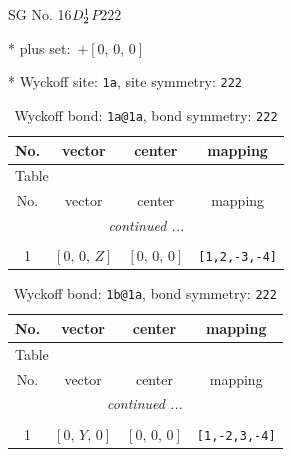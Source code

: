\documentclass[fleqn,8pt]{jsarticle}
\begin{document}
\setcounter{MaxMatrixCols}{32}

\renewcommand{\tablename}{Table~}
\renewcommand{\figurename}{Figure~}
\begin{center}
\LARGE
SG No. 16\quad$D_{\rm 2}^{1}$\quad$P222$\quad[ orthorhombic ]
\end{center}

* plus set:\,\,\,$+\left[ 0,\, 0,\, 0 \right]$


* Wyckoff site: {\tt 1a}, site symmetry: {\tt 222}
\renewcommand{\arraystretch}{1.2}
\begin{longtable}{cccc}
\caption{Wyckoff bond: {\tt 1a@1a}, bond symmetry: {\tt 222}}
 \\
 \hline \hline
No. & vector & center & mapping \\ \hline \endfirsthead

\multicolumn{3}{l}{\tablename\ \thetable{}} \\
 \hline \hline
No. & vector & center & mapping \\ \hline \endhead

 \hline \hline
\multicolumn{3}{r}{\footnotesize\it continued ...} \\ \endfoot

 \hline \hline
\multicolumn{3}{r}{} \\ \endlastfoot

1 & $\left[ 0,\, 0,\, Z \right]$ & $\left[ 0,\, 0,\, 0 \right]$ & {\tt [1,2,-3,-4]} \\
\end{longtable}
\renewcommand{\arraystretch}{1.2}
\begin{longtable}{cccc}
\caption{Wyckoff bond: {\tt 1b@1a}, bond symmetry: {\tt 222}}
 \\
 \hline \hline
No. & vector & center & mapping \\ \hline \endfirsthead

\multicolumn{3}{l}{\tablename\ \thetable{}} \\
 \hline \hline
No. & vector & center & mapping \\ \hline \endhead

 \hline \hline
\multicolumn{3}{r}{\footnotesize\it continued ...} \\ \endfoot

 \hline \hline
\multicolumn{3}{r}{} \\ \endlastfoot

1 & $\left[ 0,\, Y,\, 0 \right]$ & $\left[ 0,\, 0,\, 0 \right]$ & {\tt [1,-2,3,-4]} \\
\end{longtable}
\end{document}
